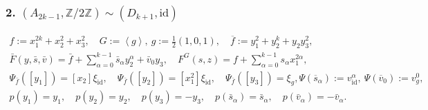 \documentclass[reqno,12pt]{amsart}
\numberwithin{equation}{section}
\theoremstyle{plain}
\theoremstyle{definition}
\newcommand{\ZZ}{{\mathbb{Z}}}
\newcommand{\id}{\mathrm{id}}
\numberwithin{equation}{section}
\begin{document}
\subsubsection*{\textbf{2.} $(A_{2k-1}, \ZZ/2\ZZ) \sim (D_{k+1}, \id)$}
\begin{gather*}
f:=x_1^{2k}+x_2^2+x_3^2,\quad G:=\left<g\right>,\ g:=\frac{1}{2}(1,0,1), \quad \overline{f}:=y_1^2+y_2^k+y_2y_3^2,
\\
\bar{F} (y, \bar{s}, \bar{v}) = \bar{f} + \sum_{\alpha=0}^{k-1} \bar{s}_\alpha y_2^\alpha + \bar{v}_0y_3, \quad F^G(s,z) = f + \sum^{k-1}_{\alpha = 0} s_\alpha x_1^{2\alpha},
\\
\Psi_{\bar{f}}([y_1]) = [x_2]\xi_{\id}, \quad \Psi_{\bar{f}}([y_2]) = [x_1^2]\xi_{\id}, \quad \Psi_{\bar{f}}([y_3]) = \xi_{g},
\Psi (\overline s_\alpha) := v_\id^{\alpha}, \ \Psi (\overline v_0) := v_g^{0},
\\
p(y_1) = y_1, \quad p(y_2) = y_2, \quad p(y_3) = -y_3, \quad p(\bar{s}_\alpha) = \bar{s}_\alpha, \quad p(\bar{v}_\alpha) = - \bar{v}_\alpha.
\end{gather*}
\end{document}
